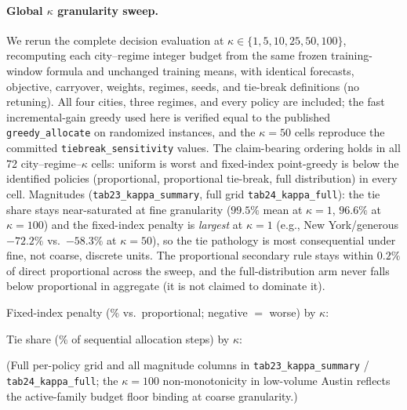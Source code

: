 \begingroup\sloppy
\paragraph{Global $\kappa$ granularity sweep.} We rerun the complete
decision evaluation at $\kappa \in \{1,5,10,25,50,100\}$, recomputing each
city--regime integer budget from the same frozen training-window formula
and unchanged training means, with identical forecasts, objective,
carryover, weights, regimes, seeds, and tie-break definitions (no
retuning). All four cities, three regimes, and every policy are included;
the fast incremental-gain greedy used here is verified equal to the
published \texttt{greedy\_allocate} on randomized instances, and the
$\kappa=50$ cells reproduce the committed
\texttt{tiebreak\_sensitivity} values. The claim-bearing ordering holds
in all 72 city--regime--$\kappa$ cells: uniform is worst and fixed-index
point-greedy is below the identified policies (proportional, proportional
tie-break, full distribution) in every cell. Magnitudes
(\texttt{tab23\_kappa\_summary}, full grid
\texttt{tab24\_kappa\_full}): the tie share stays near-saturated at fine
granularity ($99.5\%$ mean at $\kappa=1$, $96.6\%$ at $\kappa=100$) and
the fixed-index penalty is \emph{largest} at $\kappa=1$ (e.g., New
York/generous $-72.2\%$ vs.\ $-58.3\%$ at $\kappa=50$), so the tie
pathology is most consequential under fine, not coarse, discrete units.
The proportional secondary rule stays within $0.2\%$ of direct
proportional across the sweep, and the full-distribution arm never falls
below proportional in aggregate (it is not claimed to dominate it).

Fixed-index penalty (\% vs.\ proportional; negative $=$ worse) by $\kappa$:

\noindent\resizebox{\linewidth}{!}{}

Tie share (\% of sequential allocation steps) by $\kappa$:

\noindent\resizebox{\linewidth}{!}{}

(Full per-policy grid and all magnitude columns in \texttt{tab23\_kappa\_summary} / \texttt{tab24\_kappa\_full}; the $\kappa=100$ non-monotonicity in low-volume Austin reflects the active-family budget floor binding at coarse granularity.)

